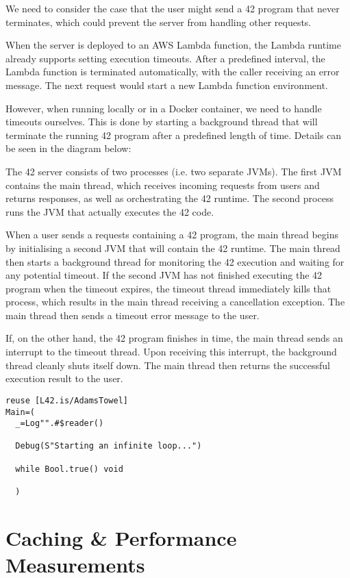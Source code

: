 We need to consider the case that the user might send a 42 program that never terminates, which could prevent the server from handling other requests.

When the server is deployed to an AWS Lambda function, the Lambda runtime already supports setting execution timeouts. After a predefined interval, the Lambda function is terminated automatically, with the caller receiving an error message. The next request would start a new Lambda function environment.

However, when running locally or in a Docker container, we need to handle timeouts ourselves. This is done by starting a background thread that will terminate the running 42 program after a predefined length of time. Details can be seen in the diagram below:


The 42 server consists of two processes (i.e. two separate JVMs). The first JVM contains the main thread, which receives incoming requests from users and returns responses, as well as orchestrating the 42 runtime. The second process runs the JVM that actually executes the 42 code.

When a user sends a requests containing a 42 program, the main thread begins by initialising a second JVM that will contain the 42 runtime. The main thread then starts a background thread for monitoring the 42 execution and waiting for any potential timeout. If the second JVM has not finished executing the 42 program when the timeout expires, the timeout thread immediately kills that process, which results in the main thread receiving a cancellation exception. The main thread then sends a timeout error message to the user.

If, on the other hand, the 42 program finishes in time, the main thread sends an interrupt to the timeout thread. Upon receiving this interrupt, the background thread cleanly shuts itself down. The main thread then returns the successful execution result to the user.

\begin{lstlisting}[caption=Infinite Loop in 42]
reuse [L42.is/AdamsTowel]
Main=(
  _=Log"".#$reader()

  Debug(S"Starting an infinite loop...")
  
  while Bool.true() void
  
  )
\end{lstlisting}

\section{Caching \& Performance Measurements}

